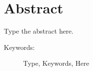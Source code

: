 {\latin\RPtrue
	\section*{Abstract}
	Type the abstract here.
	
	\begin{description}
		\item[Keywords:]
		Type, Keywords, Here
	\end{description}
}
\RPfalse